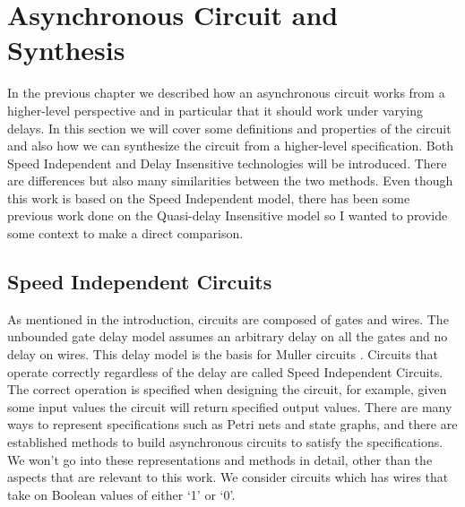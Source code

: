 \documentclass[12pt]{report}
\begin{document}
\section{Asynchronous Circuit and Synthesis}
In the previous chapter we described how an asynchronous circuit works from a higher-level perspective and in particular that it should work under varying delays. In this section we will cover some definitions and properties of the circuit and also how we can synthesize the circuit from a higher-level specification. Both Speed Independent and Delay Insensitive technologies will be introduced. There are differences but also many similarities between the two methods. Even though this work is based on the Speed Independent model, there has been some previous work done on the Quasi-delay Insensitive model so I wanted to provide some context to make a direct comparison.

\subsection{Speed Independent Circuits}
As mentioned in the introduction, circuits are composed of gates and wires. The unbounded gate delay model assumes an arbitrary delay on all the gates and no delay on wires. This delay model is the basis for Muller circuits \cite{Muller_59}. Circuits that operate correctly regardless of the delay are called Speed Independent Circuits. The correct operation is specified when designing the circuit, for example, given some input values the circuit will return specified output values. 
There are many ways to represent specifications such as Petri nets and state graphs, and there are established methods to build asynchronous circuits to satisfy the specifications. We won't go into these representations and methods in detail, other than the aspects that are relevant to this work. We consider circuits which has wires that take on Boolean values of either `1' or `0'.\\
\end{document}
